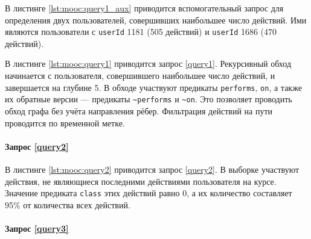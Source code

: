 В листинге \ref{lst:mooc:query1_aux} приводится вспомогательный запрос для определения двух пользователей, совершивших
наибольшее число действий. Ими являются пользователи с \texttt{userId} 1181 (505 действий) и \texttt{userId} 1686
(470 действий).


В листинге \ref{lst:mooc:query1} приводится запрос \ref{query1}. Рекурсивный обход начинается с пользователя,
совершившего наибольшее число действий, и завершается на глубине 5. В обходе участвуют предикаты \texttt{performs},
\texttt{on}, а также их обратные версии --- предикаты \texttt{\textasciitilde performs} и \texttt{\textasciitilde on}.
Это позволяет проводить обход графа без учёта направления рёбер. Фильтрация действий на пути проводится по временной метке.


\paragraph{Запрос \ref{query2}}

В листинге \ref{lst:mooc:query2} приводится запрос \ref{query2}. В выборке участвуют действия, не являющиеся последними
действиями пользователя на курсе. Значение предиката \texttt{class} этих действий равно 0, а их количество составляет 95\%
от количества всех действий.


\paragraph{Запрос \ref{query3}}

